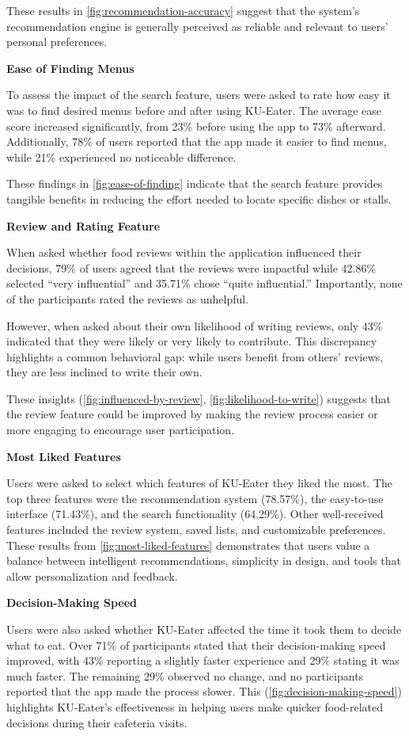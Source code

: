 These results in \ref{fig:recommendation-accuracy} suggest that the system's recommendation engine is generally perceived as reliable and relevant to users' personal preferences.

\textbf{Ease of Finding Menus}

To assess the impact of the search feature, users were asked to rate how easy it was to find desired menus before and after using KU-Eater.
The average ease score increased significantly, from 23\% before using the app to 73\% afterward.
Additionally, 78\% of users reported that the app made it easier to find menus, while 21\% experienced no noticeable difference.

These findings in \ref{fig:ease-of-finding} indicate that the search feature provides tangible benefits in reducing the effort needed to locate specific dishes or stalls.

\textbf{Review and Rating Feature}

When asked whether food reviews within the application influenced their decisions, 79\% of users agreed that the reviews were impactful while 
42.86\% selected “very influential” and 35.71\% chose “quite influential.” Importantly, none of the participants rated the reviews as unhelpful. 

However, when asked about their own likelihood of writing reviews, only 43\% indicated that they were
likely or very likely to contribute. This discrepancy highlights a common behavioral gap: while users benefit from others' reviews,
they are less inclined to write their own.

These insights (\ref{fig:influenced-by-review}, \ref{fig:likelihood-to-write}) suggests that the review feature
could be improved by making the review process easier or more engaging to encourage user participation.

\textbf{Most Liked Features}

Users were asked to select which features of KU-Eater they liked the most. The top three features were the recommendation system
(78.57\%), the easy-to-use interface (71.43\%), and the search functionality (64.29\%). Other well-received features
included the review system, saved lists, and customizable preferences.
These results from \ref{fig:most-liked-features} demonstrates that users value a balance between intelligent recommendations, simplicity in design, and tools that allow personalization and feedback.

\textbf{Decision-Making Speed}

Users were also asked whether KU-Eater affected the time it took them to decide what to eat. Over 71\% of participants stated that
their decision-making speed improved, with 43\% reporting a slightly faster experience and 29\% stating
it was much faster. The remaining 29\% observed no change, and no participants reported that the app made the
process slower. This (\ref{fig:decision-making-speed}) highlights KU-Eater's effectiveness in helping users make quicker food-related decisions during their cafeteria visits.

